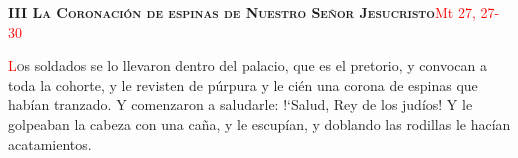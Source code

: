 \noindent\textbf{\textsc{III La Coronación de espinas de Nuestro Señor Jesucristo}}\hfill\textcolor{red}{Mt 27, 27-30}

\vspace{0.25em}

\lettrine[lines=2]{\textcolor{red}{L}}os soldados se lo llevaron dentro del palacio, que es el pretorio, y convocan a toda la cohorte, y le revisten
de púrpura y le cién una corona de espinas que habían tranzado. Y comenzaron a saludarle: {!`}Salud, Rey de los judíos! Y le golpeaban la cabeza con
una caña, y le escupían, y doblando las rodillas le hacían acatamientos.